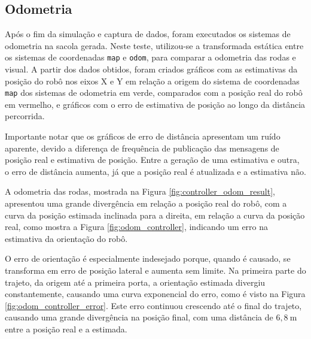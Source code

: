 \documentclass[repeatfields,xlists,xpacks,oneside,yearsonly]{ufrgscca}
\begin{document}
\subsection{Odometria}

Após o fim da simulação e captura de dados, foram executados os
sistemas de odometria na sacola gerada. Neste teste, utilizou-se a
transformada estática entre os sistemas de coordenadas \texttt{map} e
\texttt{odom}, para comparar a odometria das rodas e visual. A partir
dos dados obtidos, foram criados gráficos com as estimativas da
posição do robô nos eixos X e Y em relação a origem do sistema de
coordenadas \texttt{map} dos sistemas de odometria em verde,
comparados com a posição real do robô em vermelho, e gráficos com o
erro de estimativa de posição ao longo da distância percorrida.

Importante notar que os gráficos de erro de distância apresentam um
ruído aparente, devido a diferença de frequência de publicação das
mensagens de posição real e estimativa de posição. Entre a geração de
uma estimativa e outra, o erro de distância aumenta, já que a posição
real é atualizada e a estimativa não.

A odometria das rodas, mostrada na Figura
\ref{fig:controller_odom_result}, apresentou uma grande divergência
em relação a posição real do robô, com a curva da posição estimada
inclinada para a direita, em relação a curva da posição real, como
mostra a Figura \ref{fig:odom_controller}, indicando um erro na
estimativa da orientação do robô.

O erro de orientação é especialmente indesejado porque, quando é
causado, se transforma em erro de posição lateral e aumenta sem
limite\cite{borenstein}. Na primeira parte do trajeto, da origem até
a primeira porta, a orientação estimada divergiu constantemente,
causando uma curva exponencial do erro, como é visto na Figura
\ref{fig:odom_controller_error}. Este erro continuou crescendo até o
final do trajeto, causando uma grande divergência na posição final,
com uma distância de $6,8~\si{\meter}$ entre a posição real e a
estimada.
\end{document}
